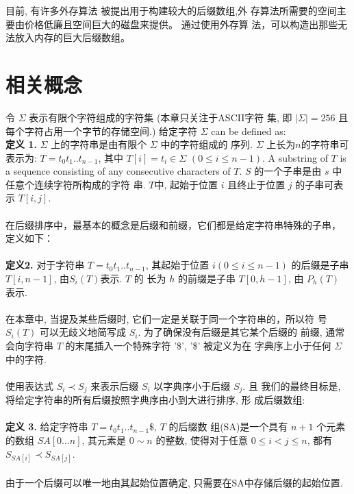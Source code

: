 \documentclass{ws-ijprai}
\begin{document}
目前, 有许多外存算法\cite{em_1,em_2,em_3} 被提出用于构建较大的后缀数组,外
存算法所需要的空间主要由价格低廉且空间巨大的磁盘来提供。 通过使用外存算
法，可以构造出那些无法放入内存的巨大后缀数组。

\section{相关概念}
\label{sec:stucture}

令 $\Sigma$ 表示有限个字符组成的字符集 (本章只关注于ASCII字符
集, 即 $|\Sigma| = 256$ 且每个字符占用一个字节的存储空间.)  给定字符
$\Sigma$ can be defined as:\\

\textbf{定义 1.} $\Sigma$ 上的字符串是由有限个 $\Sigma$ 中的字符组成的
序列. $\Sigma$ 上长为$n$的字符串可表示为: $T =
t_0t_1..t_{n-1}$, 其中 $T[i] = t_i \in \Sigma$ $(0 \leq i \leq
n-1)$. A substring of $T$ is a sequence consisting of any consecutive
characters of $T$. $S$ 的一个子串是由 $s$ 中任意个连续字符所构成的字符
串. $T$中, 起始于位置 $i$ 且终止于位置 $j$ 的子串可表示 $T[i,j]$.\\
\\
在后缀排序中，最基本的概念是后缀和前缀，它们都是给定字符串特殊的子串，
定义如下：\\
\\
\textbf{定义2.} 对于字符串 $T = t_0t_1..t_{n-1}$, 其起始于位置
$i(0 \leq i \leq n-1)$ 的后缀是子串 $T[i,n-1]$, 由$S_i(T)$表示.  $T$ 的
长为 $h$ 的前缀是子串 $T[0,h-1]$, 由 $P_h(T)$ 表示.\\
\\
在本章中, 当提及某些后缀时, 它们一定是关联于同一个字符串的，所以符
号 $S_i(T)$ 可以无歧义地简写成 $S_i$. 为了确保没有后缀是其它某个后缀的
前缀, 通常会向字符串 $T$ 的末尾插入一个特殊字符 '\$', '\$' 被定义为在
字典序上小于任何 $\Sigma$ 中的字符.\\
\\
使用表达式 $S_i \prec S_j$ 来表示后缀 $S_i$ 以字典序小于后缀 $S_j$. 且
我们的最终目标是, 将给定字符串的所有后缀按照字典序由小到大进行排序, 形
成后缀数组:\\
\\
\textbf{定义 3.} 给定字符串 $T = t_0t_1..t_{n-1}\$$, $T$ 的后缀数
组(SA)是一个具有 $n+1$ 个元素的数组 $SA[0 \dots n]$, 其元素是 $0 \sim
n$ 的整数, 使得对于任意 $0
\leq i < j \leq n$, 都有 $S_{SA[i]} \prec S_{SA[j]}$.\\
\\
由于一个后缀可以唯一地由其起始位置确定, 只需要在SA中存储后缀的起始位置.\\
\end{document}
